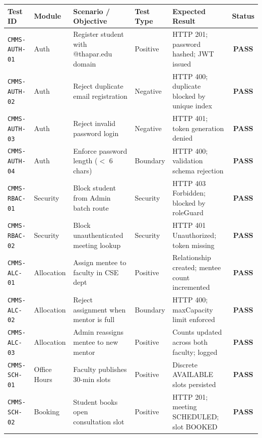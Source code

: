 \documentclass[11pt,a4paper]{article}
\begin{document}
\begin{table}[H]
\centering
\scriptsize
\begin{tabularx}{\textwidth}{p{1.9cm}p{1.7cm}Xp{1.5cm}p{3.2cm}c}
\toprule
\rowcolor{lightgray} \textbf{Test ID} & \textbf{Module} & \textbf{Scenario / Objective} & \textbf{Test Type} & \textbf{Expected Result} & \textbf{Status} \\
\midrule
\texttt{CMMS-AUTH-01} & Auth & Register student with @thapar.edu domain & Positive & HTTP 201; password hashed; JWT issued & \textbf{\color{successgreen}PASS} \\
\texttt{CMMS-AUTH-02} & Auth & Reject duplicate email registration & Negative & HTTP 400; duplicate blocked by unique index & \textbf{\color{successgreen}PASS} \\
\texttt{CMMS-AUTH-03} & Auth & Reject invalid password login & Negative & HTTP 401; token generation denied & \textbf{\color{successgreen}PASS} \\
\texttt{CMMS-AUTH-04} & Auth & Enforce password length ($<$ 6 chars) & Boundary & HTTP 400; validation schema rejection & \textbf{\color{successgreen}PASS} \\
\texttt{CMMS-RBAC-01} & Security & Block student from Admin batch route & Security & HTTP 403 Forbidden; blocked by roleGuard & \textbf{\color{successgreen}PASS} \\
\texttt{CMMS-RBAC-02} & Security & Block unauthenticated meeting lookup & Security & HTTP 401 Unauthorized; token missing & \textbf{\color{successgreen}PASS} \\
\texttt{CMMS-ALC-01}  & Allocation & Assign mentee to faculty in CSE dept & Positive & Relationship created; mentee count incremented & \textbf{\color{successgreen}PASS} \\
\texttt{CMMS-ALC-02}  & Allocation & Reject assignment when mentor is full & Boundary & HTTP 400; maxCapacity limit enforced & \textbf{\color{successgreen}PASS} \\
\texttt{CMMS-ALC-03}  & Allocation & Admin reassigns mentee to new mentor & Positive & Counts updated across both faculty; logged & \textbf{\color{successgreen}PASS} \\
\texttt{CMMS-SCH-01}  & Office Hours & Faculty publishes 30-min slots & Positive & Discrete AVAILABLE slots persisted & \textbf{\color{successgreen}PASS} \\
\texttt{CMMS-SCH-02}  & Booking & Student books open consultation slot & Positive & HTTP 201; meeting SCHEDULED; slot BOOKED & \textbf{\color{successgreen}PASS} \\

\end{tabularx}
\end{table}
\end{document}
